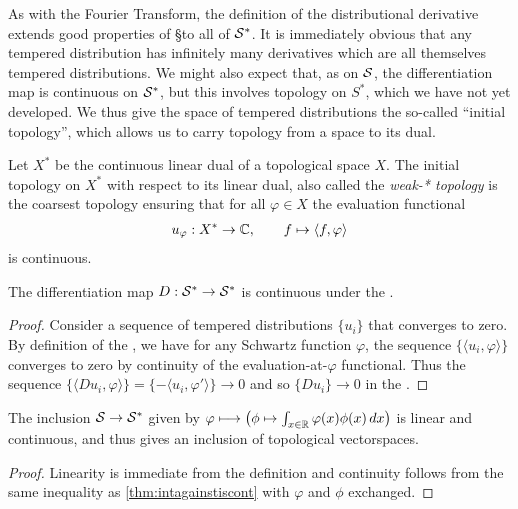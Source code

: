     As with the Fourier Transform, the definition of the distributional derivative extends good properties of \S to all of $\S^*$.
    It is immediately obvious that any tempered distribution has infinitely many derivatives which are all themselves tempered distributions.
    We might also expect that, as on $\S$, the differentiation map is continuous on $\S^*$, but this involves topology on $S^*$, which we have not yet developed.
    We thus give the space of tempered distributions the so-called ``initial topology'', which allows us to carry topology from a space to its dual.
    \begin{defn}
      Let $X^*$ be the continuous linear dual of a topological space $X$.
      The initial topology on $X^*$ with respect to its linear dual, also called the \emph{weak-* topology} is the coarsest topology ensuring that for all $\varphi\in X$ the evaluation functional
      \begin{gather*}
        u_\varphi: X^*\rightarrow\C, \qquad f\mapsto\langle f,\varphi\rangle
      \end{gather*}
      is continuous.
    \end{defn}

    \begin{claim}
      The differentiation map $D:\SS\rightarrow\SS$ is continuous under the \ws.
    \end{claim}
    \begin{proof}
      Consider a sequence of tempered distributions $\{u_i\}$ that converges to zero.
      By definition of the \ws, we have for any Schwartz function $\varphi$, the sequence $\{\langle u_i,\varphi\rangle\}$ converges to zero by continuity of the evaluation-at-$\varphi$ functional.
      Thus the sequence $ \{\langle Du_i, \varphi\rangle\} = \{-\langle u_i, \varphi'\rangle\} \rightarrow 0 $ and so $\{Du_i\}\rightarrow 0$ in the \ws.
    \end{proof}

    \begin{thm}
      The inclusion $\S\rightarrow\SS$ given by $\varphi\longmapsto\left( \phi\mapsto \int_{x\in\R} \varphi(x)\phi(x)\,dx \right)$ is linear and continuous, and thus gives an inclusion of topological vectorspaces.
    \end{thm}
    \begin{proof}
      Linearity is immediate from the definition and continuity follows from the same inequality as \cref{thm:intagainstiscont} with $\varphi$ and $\phi$ exchanged.
    \end{proof}

